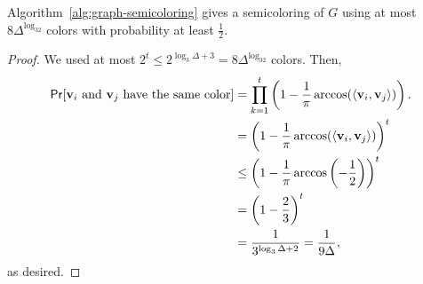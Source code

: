         \begin{lemma*}
            Algorithm~\ref{alg:graph-semicoloring} gives a semicoloring of \(G\) using at most \(8\Delta^{\log_32}\) colors with probability at least \(\frac{1}{2}\).
            \begin{proof}
                We used at most \(2^t\leq 2^{\log_3\Delta+3}=8\Delta^{\log_32}\) colors. Then,
                \begin{align*}
                    \mathsf{Pr}[\mathbf{v}_i\text{ and }\mathbf{v}_j\text{ have the same color}]&=\prod_{k=1}^t \left(1-\frac{1}{\pi}\arccos(\left\langle \mathbf{v}_i,\mathbf{v}_j\right\rangle)\right). \\
                    &=\left(1-\frac{1}{\pi}\arccos(\left\langle \mathbf{v}_i,\mathbf{v}_j\right\rangle)\right)^t \\
                    &\leq \left(1-\frac{1}{\pi}\arccos\left(-\frac{1}{2}\right)\right)^t \\
                    &=\left(1-\frac{2}{3}\right)^t \\
                    &=\frac{1}{3^{\log_3\Delta+2}}=\frac{1}{9\Delta},
                \end{align*}
                as desired.
            \end{proof}
        \end{lemma*}